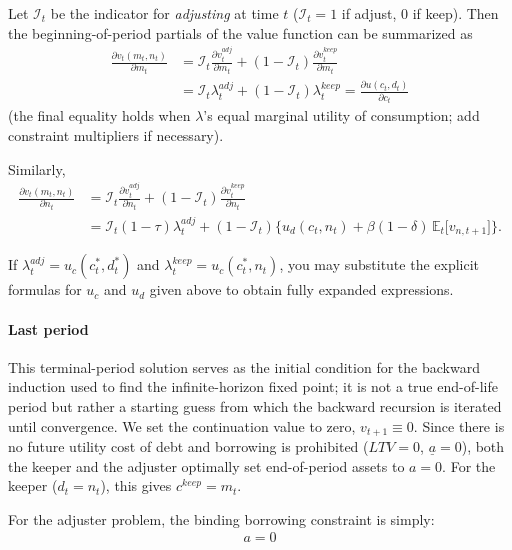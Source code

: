 Let \(\mathcal{I}_t\) be the indicator for \emph{adjusting} at time \(t\) (\(\mathcal{I}_t=1\) if adjust, $0$ if keep). Then the beginning-of-period partials of the value function can be summarized as
\begin{align}
	\frac{\partial v_t(m_t,n_t)}{\partial m_t}
	&= \mathcal{I}_t \frac{\partial v_t^{adj}}{\partial m_t}
	+ (1-\mathcal{I}_t) \frac{\partial v_t^{keep}}{\partial m_t} \\
	&= \mathcal{I}_t \lambda_t^{adj} + (1-\mathcal{I}_t) \lambda_t^{keep}
	= \frac{\partial u(c_t,d_t)}{\partial c_t}
	\label{eq:combined_m_basic}
\end{align}
(the final equality holds when \(\lambda\)'s equal marginal utility of consumption; add constraint multipliers if necessary).

Similarly,
\begin{align}
	\frac{\partial v_t(m_t,n_t)}{\partial n_t}
	&= \mathcal{I}_t \frac{\partial v_t^{adj}}{\partial n_t}
	+ (1-\mathcal{I}_t) \frac{\partial v_t^{keep}}{\partial n_t} \\
	&= \mathcal{I}_t (1-\tau)\lambda_t^{adj}
	+ (1-\mathcal{I}_t)\Bigg\{ u_d(c_t,n_t)
	+ \beta (1-\delta)\, \mathbb{E}_t\big[v_{n,t+1}\big]\Bigg\}.
	\label{eq:combined_n_basic}
\end{align}

If \(\lambda_t^{adj}=u_c(c_t^\ast,d_t^\ast)\) and \(\lambda_t^{keep}=u_c(c_t^\ast,n_t)\), you may substitute the explicit formulas for \(u_c\) and \(u_d\) given above to obtain fully expanded expressions.


\paragraph{Last period}
This terminal-period solution serves as the initial condition for the backward induction used to find the infinite-horizon fixed point; it is not a true end-of-life period but rather a starting guess from which the backward recursion is iterated until convergence. We set the continuation value to zero, $v_{t+1}\equiv 0$. Since there is no future utility cost of debt and borrowing is prohibited ($LTV=0$, $\underline{a}=0$), both the keeper and the adjuster optimally set end-of-period assets to $a = 0$. For the keeper ($d_t = n_t$), this gives $c^{keep} = m_t$.

For the adjuster problem, the binding borrowing constraint is simply:
\begin{align}
	a = 0
\end{align}


